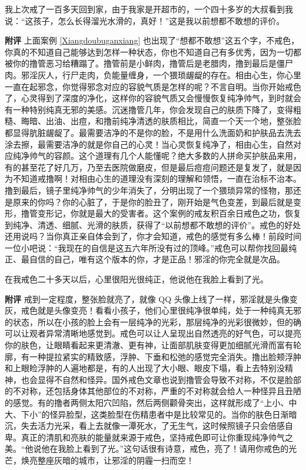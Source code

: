 \begin{case}
    我上次戒了一百多天回到家，由于我家是开超市的，一个四十多岁的大叔看到我说：“这孩子，怎么长得溜光水滑的，真好！”这是我以前想都不敢想的评价。

    \textbf{附评} 上面案例 \ref{Xiangdoubuganxiang} 也出现了“想都不敢想”这五个字，不戒色，你真的不知道自己能够达到怎样一种状态，你也不知道自己有多优秀，因为一切都被你的撸管恶习给糟蹋了。撸管前是小鲜肉，撸管后是老腊肉，撸到最后是僵尸肉。邪淫灰人，行尸走肉，负能量缠身，一个猥琐龌龊的存在。相由心生，你心里一直在起邪念，你觉得邪念对应的容貌气质是怎样的呢？不言自明。当你开始戒色了，心灵得到了深度的净化，这样你的容貌气质又会慢慢恢复纯净帅气，到时就会有一种特别纯真无邪的美感。沉迷撸管几年，你会发现自己的肤质下降了，变得粗糙、晦暗、出油、出痘，和撸前纯净清透的肤质相比，简直一个天一个地，整张脸都显得肮脏龌龊了。最需要洁净的不是你的脸，不是用什么洗面奶和护肤品去洗去涂去擦，最需要洁净的就是你自己的心灵！当心灵恢复纯净了，相由心生，自然对应纯净帅气的容颜。这个道理有几个人能懂呢？绝大多数的人拼命买护肤品来用，有的甚至花了好几万，乃至去医院做磨皮，但是最后痘痘问题还是复发了，就是因为不知道戒撸啊！对相由心生的道理没有深刻的理解和领悟，一直在治标不治本。撸到最后，镜子里纯净帅气的少年消失了，分明出现了一个猥琐异常的怪物，那还是原来的你吗？你的心脏了，于是你的脸丑了，刚开始是气色变差，到最后就是变形，撸管变形记，你就是最大的受害者。这个案例的戒友积百余日戒色之功，恢复到纯净、清透、细腻、光滑的肤质，获得了“以前想都不敢想的评价”。戒色的好处还用说吗？当你真正亲自体会到了，你才会知道，戒色的感觉有多么棒！前段时间一位小吧说：“我现在的自信是这五六年所没有过的顶峰。”戒色可以帮你找回最纯正、最自信的自己，唯有这个版本的你，才是正品！邪淫的你完全就是次品。
\end{case}

\begin{case}
    在我戒色二十多天以后，心里很阳光很纯正，他说他在我脸上看到了光。

    \textbf{附评} 戒到一定程度，整张脸就亮了，就像 QQ 头像上线了一样，邪淫就是头像变灰，戒色就是头像变亮！看看小孩子，他们心里很纯净很单纯，处于一种纯真无邪的状态，所以在小孩的脸上会有一层纯净的光彩，那层纯净的光彩很微妙，但的确可以让观者异常清晰地感觉到。戒色可以让人呈现出自然透亮的好气色，可以提亮你的肤色，让眼睛看起来更清澈、更有神，让面部肌肤变得更加细腻光滑而富有轮廓，有一种提拉紧实的精致感，浮肿、下垂和松弛的感觉完全消失。撸出脸颊浮肿和上眼睑浮肿的人遍地都是，有的人出现了大小眼、眼皮下塌，看上去特别没精神，也会显得不自然和怪异。国外戒色文章也说到撸管会导致不对称，不仅是脸部的不对称，还包括身体其他部位的不对称，严重的不对称就会给人一种怪异且丑陋的感觉。有的撸者两侧太阳穴凹陷，然后两侧颧骨突出，这样就形成了“上小、中大、下小”的怪异脸型，这类脸型在伤精患者中是比较常见的。当你的肤色日渐暗沉，失去活力光采，看上去就像一潭死水，了无生气，这时候照镜子只会倍感自卑。真正的清肌和亮肤的能量就来源于戒色，坚持戒色即可让你重现纯净帅气之美。“他说他在我脸上看到了光。”这句话很有诗意，戒色，亮了！请用你戒色的光芒，焕亮整座灰暗的城市，让邪淫的阴霾一扫而空！
\end{case}

